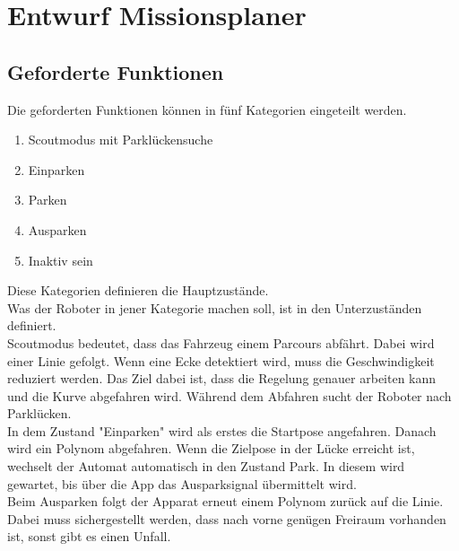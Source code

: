 \chapter{Entwurf Missionsplaner}

\section{Geforderte Funktionen}

Die geforderten Funktionen können in fünf Kategorien eingeteilt werden.
\renewcommand{\labelenumi}{\roman{enumi}}
\begin{enumerate}
\item 	Scoutmodus mit Parklückensuche
\item 	Einparken
\item	Parken
\item	Ausparken
\item	Inaktiv sein
\end{enumerate}

\noindent Diese Kategorien definieren die Hauptzustände.\\

\noindent Was der Roboter in jener Kategorie machen soll, ist in den Unterzuständen definiert.\\


\noindent Scoutmodus bedeutet, dass das Fahrzeug einem Parcours abfährt. Dabei wird einer Linie gefolgt. Wenn eine Ecke detektiert wird, muss die Geschwindigkeit reduziert werden. Das Ziel dabei ist, dass die Regelung genauer arbeiten kann und die Kurve abgefahren wird. Während dem Abfahren sucht der Roboter nach Parklücken.\\


\noindent In dem Zustand "Einparken" wird als erstes die Startpose angefahren. Danach wird ein Polynom abgefahren. Wenn die Zielpose in der Lücke erreicht ist, wechselt der Automat automatisch in den Zustand Park. In diesem wird gewartet, bis über die App das Ausparksignal übermittelt wird.\\


\noindent Beim Ausparken folgt der Apparat erneut einem Polynom zurück auf die Linie. Dabei muss sichergestellt werden, dass nach vorne genügen Freiraum vorhanden ist, sonst gibt es einen Unfall.




